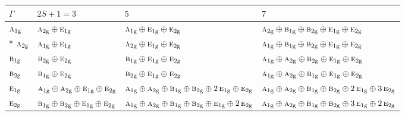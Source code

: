 \documentclass[10pt,a4paper]{article}
\numberwithin{equation}{section}
\newcommand{\irr}[1]{\text{\normalfont\scshape #1}}
\newcommand{\ptag}[1]{\mathrm{#1}}
\begin{document}
{\small\setlength{\tabcolsep}{3pt}\begin{longtable}{@{}l>{\RaggedRight\arraybackslash}p{}>{\RaggedRight\arraybackslash}p{}>{\RaggedRight\arraybackslash}p{}@{}}\toprule
$\Gamma$ & $2S + 1 = 3$ & $5$ & $7$\\\midrule\endhead
\bottomrule\endfoot\endlastfoot
$\irr{a}_{1\ptag{g}}$ & $\irr{a}_{2\ptag{g}}\oplus \irr{e}_{1\ptag{g}}$ & $\irr{a}_{1\ptag{g}}\oplus \irr{e}_{1\ptag{g}}\oplus \irr{e}_{2\ptag{g}}$ & $\irr{a}_{2\ptag{g}}\oplus \irr{b}_{1\ptag{g}}\oplus \irr{b}_{2\ptag{g}}\oplus \irr{e}_{1\ptag{g}}\oplus \irr{e}_{2\ptag{g}}$\\*
$\irr{a}_{2\ptag{g}}$ & $\irr{a}_{1\ptag{g}}\oplus \irr{e}_{1\ptag{g}}$ & $\irr{a}_{2\ptag{g}}\oplus \irr{e}_{1\ptag{g}}\oplus \irr{e}_{2\ptag{g}}$ & $\irr{a}_{1\ptag{g}}\oplus \irr{b}_{1\ptag{g}}\oplus \irr{b}_{2\ptag{g}}\oplus \irr{e}_{1\ptag{g}}\oplus \irr{e}_{2\ptag{g}}$\\
$\irr{b}_{1\ptag{g}}$ & $\irr{b}_{2\ptag{g}}\oplus \irr{e}_{2\ptag{g}}$ & $\irr{b}_{1\ptag{g}}\oplus \irr{e}_{1\ptag{g}}\oplus \irr{e}_{2\ptag{g}}$ & $\irr{a}_{1\ptag{g}}\oplus \irr{a}_{2\ptag{g}}\oplus \irr{b}_{2\ptag{g}}\oplus \irr{e}_{1\ptag{g}}\oplus \irr{e}_{2\ptag{g}}$\\
$\irr{b}_{2\ptag{g}}$ & $\irr{b}_{1\ptag{g}}\oplus \irr{e}_{2\ptag{g}}$ & $\irr{b}_{2\ptag{g}}\oplus \irr{e}_{1\ptag{g}}\oplus \irr{e}_{2\ptag{g}}$ & $\irr{a}_{1\ptag{g}}\oplus \irr{a}_{2\ptag{g}}\oplus \irr{b}_{1\ptag{g}}\oplus \irr{e}_{1\ptag{g}}\oplus \irr{e}_{2\ptag{g}}$\\
$\irr{e}_{1\ptag{g}}$ & $\irr{a}_{1\ptag{g}}\oplus \irr{a}_{2\ptag{g}}\oplus \irr{e}_{1\ptag{g}}\oplus \irr{e}_{2\ptag{g}}$ & $\irr{a}_{1\ptag{g}}\oplus \irr{a}_{2\ptag{g}}\oplus \irr{b}_{1\ptag{g}}\oplus \irr{b}_{2\ptag{g}}\oplus 2\,\irr{e}_{1\ptag{g}}\oplus \irr{e}_{2\ptag{g}}$ & $\irr{a}_{1\ptag{g}}\oplus \irr{a}_{2\ptag{g}}\oplus \irr{b}_{1\ptag{g}}\oplus \irr{b}_{2\ptag{g}}\oplus 2\,\irr{e}_{1\ptag{g}}\oplus 3\,\irr{e}_{2\ptag{g}}$\\
$\irr{e}_{2\ptag{g}}$ & $\irr{b}_{1\ptag{g}}\oplus \irr{b}_{2\ptag{g}}\oplus \irr{e}_{1\ptag{g}}\oplus \irr{e}_{2\ptag{g}}$ & $\irr{a}_{1\ptag{g}}\oplus \irr{a}_{2\ptag{g}}\oplus \irr{b}_{1\ptag{g}}\oplus \irr{b}_{2\ptag{g}}\oplus \irr{e}_{1\ptag{g}}\oplus 2\,\irr{e}_{2\ptag{g}}$ & $\irr{a}_{1\ptag{g}}\oplus \irr{a}_{2\ptag{g}}\oplus \irr{b}_{1\ptag{g}}\oplus \irr{b}_{2\ptag{g}}\oplus 3\,\irr{e}_{1\ptag{g}}\oplus 2\,\irr{e}_{2\ptag{g}}$\\

\end{longtable}}
\end{document}
